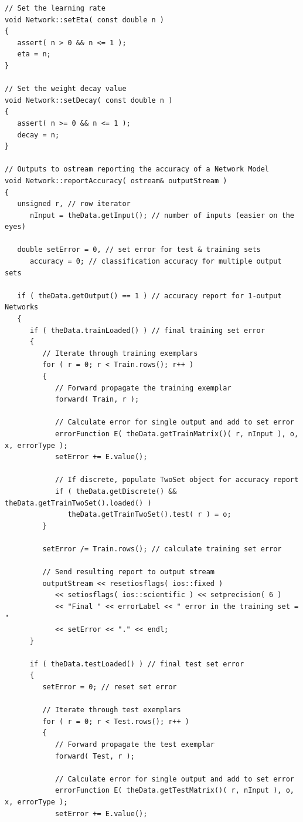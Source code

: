 \documentclass{report}[10pt]
\begin{document}
\begin{verbatim}
// Set the learning rate
void Network::setEta( const double n )
{
   assert( n > 0 && n <= 1 );
   eta = n;
}

// Set the weight decay value
void Network::setDecay( const double n )
{
   assert( n >= 0 && n <= 1 );
   decay = n;
}

// Outputs to ostream reporting the accuracy of a Network Model
void Network::reportAccuracy( ostream& outputStream )
{
   unsigned r, // row iterator
      nInput = theData.getInput(); // number of inputs (easier on the eyes)
            
   double setError = 0, // set error for test & training sets
      accuracy = 0; // classification accuracy for multiple output sets
   
   if ( theData.getOutput() == 1 ) // accuracy report for 1-output Networks
   {
      if ( theData.trainLoaded() ) // final training set error
      {
         // Iterate through training exemplars
         for ( r = 0; r < Train.rows(); r++ )
         {
            // Forward propagate the training exemplar
            forward( Train, r );
            
            // Calculate error for single output and add to set error
            errorFunction E( theData.getTrainMatrix()( r, nInput ), o, x, errorType );
            setError += E.value();

            // If discrete, populate TwoSet object for accuracy report
            if ( theData.getDiscrete() && theData.getTrainTwoSet().loaded() )
               theData.getTrainTwoSet().test( r ) = o;
         }
         
         setError /= Train.rows(); // calculate training set error

         // Send resulting report to output stream
         outputStream << resetiosflags( ios::fixed )
            << setiosflags( ios::scientific ) << setprecision( 6 )
            << "Final " << errorLabel << " error in the training set = "
            << setError << "." << endl;
      }
      
      if ( theData.testLoaded() ) // final test set error
      {
         setError = 0; // reset set error
         
         // Iterate through test exemplars
         for ( r = 0; r < Test.rows(); r++ )
         {
            // Forward propagate the test exemplar
            forward( Test, r );
            
            // Calculate error for single output and add to set error
            errorFunction E( theData.getTestMatrix()( r, nInput ), o, x, errorType );
            setError += E.value();


\end{verbatim}
\end{document}
